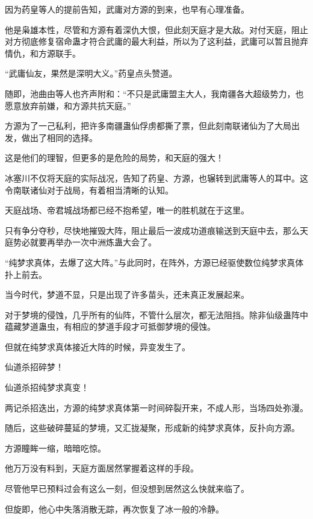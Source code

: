 
\begin{this_body}

因为药皇等人的提前告知，武庸对方源的到来，也早有心理准备。

他是枭雄本性，尽管和方源有着深仇大恨，但此刻天庭才是大敌。对付天庭，阻止对方彻底修复宿命蛊才符合武庸的最大利益，所以为了这利益，武庸可以暂且抛弃情仇，和方源联手。

“武庸仙友，果然是深明大义。”药皇点头赞道。

随即，池曲由等人也齐声附和：“不只是武庸盟主大人，我南疆各大超级势力，也愿意放弃前嫌，和方源共抗天庭。”

方源为了一己私利，把许多南疆蛊仙俘虏都撕了票，但此刻南联诸仙为了大局出发，做出了相同的选择。

这是他们的理智，但更多的是危险的局势，和天庭的强大！

冰塞川不仅将天庭的实际战况，告知了药皇、方源，也辗转到武庸等人的耳中。这令南联诸仙对于战局，有着相当清晰的认知。

天庭战场、帝君城战场都已经不抱希望，唯一的胜机就在于这里。

只有争分夺秒，尽快地摧毁大阵，阻止最后一波成功道痕输送到天庭中去，那么天庭势必就要再举办一次中洲炼蛊大会了。

“纯梦求真体，去爆了这大阵。”与此同时，在阵外，方源已经驱使数位纯梦求真体扑上前去。

当今时代，梦道不显，只是出现了许多苗头，还未真正发展起来。

对于梦境的侵蚀，几乎所有的仙阵，不管什么层次，都无法阻挡。除非仙级蛊阵中蕴藏梦道蛊虫，有相应的梦道手段才可抵御梦境的侵蚀。

但就在纯梦求真体接近大阵的时候，异变发生了。

仙道杀招碎梦！

仙道杀招纯梦求真变！

两记杀招迭出，方源的纯梦求真体第一时间碎裂开来，不成人形，当场四处弥漫。

随后，这些破碎蔓延的梦境，又汇拢凝聚，形成新的纯梦求真体，反扑向方源。

方源瞳眸一缩，暗暗吃惊。

他万万没有料到，天庭方面居然掌握着这样的手段。

尽管他早已预料过会有这么一刻，但没想到居然这么快就来临了。

但旋即，他心中失落消散无踪，再次恢复了冰一般的冷静。


\end{this_body}
